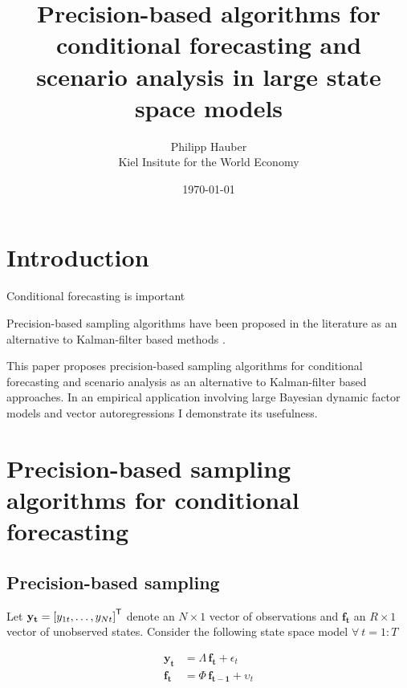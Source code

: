 \documentclass[notitlepage,a4paper,12pt]{article}
\newcommand{\transpose}[1]{{#1}^{\sf{T}}}
\begin{document}
\title{Precision-based algorithms for conditional forecasting and scenario analysis in large state space models}

\author{
  Philipp Hauber\\
  Kiel Insitute for the World Economy
}
\date{\today}

\maketitle

\section{Introduction}

Conditional forecasting is important \citep{bgl_2015ijf}

Precision-based sampling algorithms have been proposed in the literature as an alternative to Kalman-filter based methods \citep{chanjeliazkov_2009}.

This paper proposes precision-based sampling algorithms for conditional forecasting and scenario analysis as an alternative to Kalman-filter based approaches. In an empirical application involving large Bayesian dynamic factor models and vector autoregressions I demonstrate its usefulness. 

\section{Precision-based sampling algorithms for conditional forecasting}

\subsection{Precision-based sampling}

Let $\mathbf{y_t} = \transpose{[y_{1t}, \dots, y_{Nt}]}$ denote an $N \times 1$ vector of observations and $\mathbf{f_t}$ an $R \times 1$ vector of unobserved states. Consider the following state space model $\forall \: t = 1:T$

\begin{subequations}
    \label{eqn:statespacesys}
    \begin{align}
        \mathbf{y_t} &= \Lambda \, \mathbf{f_t} + \epsilon_t \label{eqn:statespacesys_meas}\\
        \mathbf{f_t} &= \Phi \, \mathbf{f_{t-1}} + \upsilon_t \label{eqn:statespacesys_trans}
    \end{align}
\end{subequations}
\end{document}

